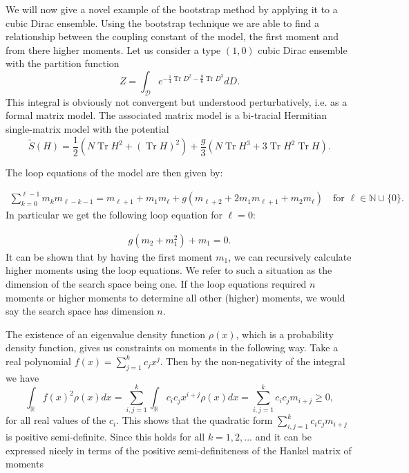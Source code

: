 \documentclass[10pt]{article}
\DeclareMathOperator{\tr}{Tr}
\begin{document}
We will now give a novel example of the bootstrap method by applying it to a cubic Dirac ensemble. Using the bootstrap technique we are able to find a relationship between the coupling constant of the model, the first moment and from there higher moments. Let us consider a  type \((1,0)\) cubic Dirac ensemble with the partition function
\begin{equation*}
	Z = \int_{\mathcal{D}} e^{-\frac{1}{4}\tr D^2 - \frac{g}{6} \tr D^3 }dD.  
\end{equation*}
This integral is obviously not convergent but understood perturbatively, i.e. as a formal matrix model. The associated matrix model is a bi-tracial Hermitian single-matrix model with the potential
\begin{equation*}
	\tilde{S}(H) = \frac{1}{2} \left(N \tr H^2 +  \left(\tr H\right)^2 \right) + \frac{g}{3}\left( N \tr H^3 + 3 \tr H^2 \tr H \right).
\end{equation*}

The loop equations of the model are then given by: 

\begin{align}\label{cubic loop eqns}
	\sum_{k = 0}^{\ell-1} m_k m_{\ell-k-1} =  m_{\ell+1} + m_1 m_{\ell} + g \left( m_{\ell+2} + 2 m_1 m_{\ell+1} + m_2 m_{\ell} \right) \quad \text{for }\ell \in \mathbb{N} \cup \{0 \}.
\end{align}
In particular we get the following loop equation for $\ell = 0$: 

\begin{align*}
	g \left( m_2 + m_1^2 \right) + m_1 = 0.
\end{align*}
It can be shown that by having the first moment $m_1$, we can recursively calculate higher moments using the loop equations. We refer to such a situation as the dimension of the search space being one. If the loop equations required $n$ moments or higher moments to determine all other (higher) moments, we would say the search space has dimension $n$. 

The existence of an eigenvalue density function $\rho(x)$, which is a probability density function, gives us constraints on moments in the following way. Take a real polynomial  $f(x) = \sum_{j=1}^{k} c_j x^j$. Then by the non-negativity of the integral we have
$$ \int_{\mathbb{R}} f(x)^{2} \rho(x) dx = \sum_{i,j=1}^{k} \int_{\mathbb{R}}c_{i}c_{j}x^{i+j}\rho (x)dx = \sum_{i,j=1}^{k}c_{i}c_{j}m_{i+j} \geq 0,$$ 
for all real values of the $c_{i}$.
This shows that the quadratic form $\sum_{i,j=1}^{k}c_{i}c_{j}m_{i+j}$ is positive semi-definite. Since this holds for all $k = 1,2,...$ and it can be expressed nicely in terms of the positive semi-definiteness of the Hankel matrix of moments
\end{document}
